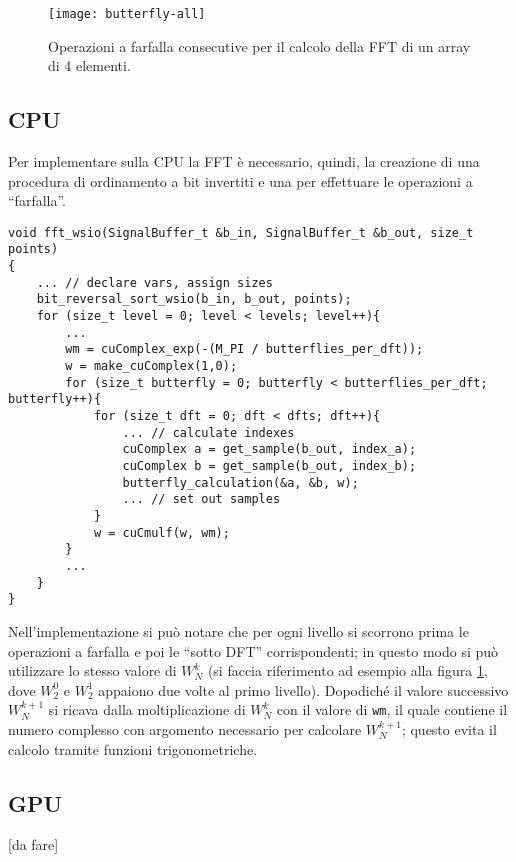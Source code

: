 \begin{figure}[h]
    \centering
    \texttt{[image: butterfly-all]}
    \caption{Operazioni a farfalla consecutive per il calcolo della FFT di un array di 4 elementi.}
    \label{fig:fftfarfalle}
\end{figure}


\subsection{CPU}
Per implementare sulla CPU la FFT è necessario, quindi, la creazione di una procedura di ordinamento a bit invertiti e una per effettuare le operazioni a ``farfalla''.

\begin{lstlisting}
void fft_wsio(SignalBuffer_t &b_in, SignalBuffer_t &b_out, size_t points)
{
    ... // declare vars, assign sizes
    bit_reversal_sort_wsio(b_in, b_out, points);
    for (size_t level = 0; level < levels; level++){
        ...
        wm = cuComplex_exp(-(M_PI / butterflies_per_dft));
        w = make_cuComplex(1,0);
        for (size_t butterfly = 0; butterfly < butterflies_per_dft; butterfly++){
            for (size_t dft = 0; dft < dfts; dft++){
                ... // calculate indexes
                cuComplex a = get_sample(b_out, index_a);
                cuComplex b = get_sample(b_out, index_b);
                butterfly_calculation(&a, &b, w);
                ... // set out samples
            }
            w = cuCmulf(w, wm);
        }
        ...
    }
}
\end{lstlisting}

Nell'implementazione si può notare che per ogni livello si scorrono prima le operazioni a farfalla e poi le ``sotto DFT'' corrispondenti; in questo modo si può utilizzare lo stesso valore di $W_N^k$ (si faccia riferimento ad esempio alla figura \ref{fig:fftfarfalle}, dove $W_2^0$ e $W_2^1$ appaiono due volte al primo livello). Dopodiché il valore successivo $W_N^{k+1}$ si ricava dalla moltiplicazione di $W_N^k$ con il valore di \lstinline{wm}, il quale contiene il numero complesso con argomento necessario per calcolare $W_N^{k+1}$; questo evita il calcolo tramite funzioni trigonometriche.

\subsection{GPU}

[da fare]
